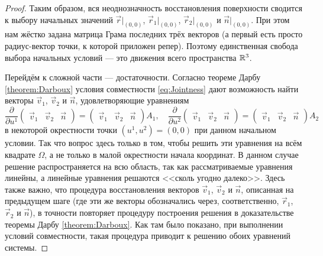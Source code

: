 \begin{proof}
	Таким образом, вся неоднозначность восстановления поверхности сводится к выбору начальных значений $\vec{r}|_{(0, 0)}$, $\vec{r}_1|_{(0, 0)}$, $\vec{r}_2|_{(0, 0)}$ и $\vec{n}|_{(0, 0)}$. При этом нам жёстко задана матрица Грама последних трёх векторов (а первый есть просто радиус-вектор точки, к которой приложен репер). Поэтому единственная свобода выбора начальных условий --- это движения всего пространства $\mathbb{R}^3$.

	Перейдём к сложной части --- достаточности. Согласно теореме Дарбу \ref{theorem:Darboux} условия совместности \eqref{eq:Jointness} дают возможность найти векторы $\vec{v}_1$, $\vec{v}_2$ и $\vec{n}$, удовлетворяющие уравнениям
	\begin{equation} \label{eq:DerivativeMatrix}
		\frac{\partial}{\partial u^1}
		\begin{pmatrix}
			\vec{v}_1 & \vec{v}_2 & \vec{n}
		\end{pmatrix} =
		\begin{pmatrix}
			\vec{v}_1 & \vec{v}_2 & \vec{n}
		\end{pmatrix}A_1,\quad
		\frac{\partial}{\partial u^2}
		\begin{pmatrix}
			\vec{v}_1 & \vec{v}_2 & \vec{n}
		\end{pmatrix} =
		\begin{pmatrix}
			\vec{v}_1 & \vec{v}_2 & \vec{n}
		\end{pmatrix}A_2
	\end{equation}
	в некоторой окрестности точки $(u^1, u^2) = (0, 0)$ при данном начальном условии. Так что вопрос здесь только в том, чтобы решить эти уравнения на всём квадрате $\Omega$, а не только в малой окрестности начала координат. В данном случае решение распространяется на всю область, так как рассматриваемые уравнения линейны, а линейные уравнения решаются <<сколь угодно далеко>>. Здесь также важно, что процедура восстановления векторов $\vec{v}_1$, $\vec{v}_2$ и $\vec{n}$, описанная на предыдущем шаге (где эти же векторы обозначались через, соответственно, $\vec{r}_1$, $\vec{r}_2$ и $\vec{n}$), в точности повторяет процедуру построения решения в доказательстве теоремы Дарбу \ref{theorem:Darboux}. Как там было показано, при выполнении условий совместности, такая процедура приводит к решению обоих уравнений системы.


\end{proof}
